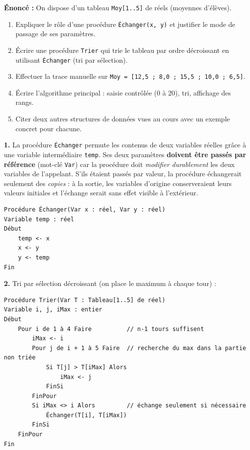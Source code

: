\documentclass[11pt]{article}
\begin{document}
\begin{corrige}
\textbf{Énoncé :} On dispose d'un tableau \texttt{Moy[1..5]} de réels (moyennes d'élèves).
\begin{enumerate}
  \item Expliquer le rôle d'une procédure \texttt{Échanger(x, y)} et justifier le mode de passage de ses paramètres.
  \item Écrire une procédure \texttt{Trier} qui trie le tableau par ordre décroissant en utilisant \texttt{Échanger} (tri par sélection).
  \item Effectuer la trace manuelle sur \texttt{Moy = [12,5 ; 8,0 ; 15,5 ; 10,0 ; 6,5]}.
  \item Écrire l'algorithme principal : saisie contrôlée (0 à 20), tri, affichage des rangs.
  \item Citer deux autres structures de données vues au cours avec un exemple concret pour chacune.
\end{enumerate}
\tcblower
\textbf{1.} La procédure \texttt{Échanger} permute les contenus de deux variables réelles grâce à une variable intermédiaire \texttt{temp}. Ses deux paramètres \textbf{doivent être passés par référence} (mot-clé \texttt{Var}) car la procédure doit \emph{modifier durablement} les deux variables de l'appelant. S'ils étaient passés par valeur, la procédure échangerait seulement des \emph{copies} : à la sortie, les variables d'origine conserveraient leurs valeurs initiales et l'échange serait sans effet visible à l'extérieur.

\begin{lstlisting}
Procédure Échanger(Var x : réel, Var y : réel)
Variable temp : réel
Début
    temp <- x
    x <- y
    y <- temp
Fin
\end{lstlisting}

\textbf{2.} Tri par sélection décroissant (on place le maximum à chaque tour) :

\begin{lstlisting}
Procédure Trier(Var T : Tableau[1..5] de réel)
Variable i, j, iMax : entier
Début
    Pour i de 1 à 4 Faire          // n-1 tours suffisent
        iMax <- i
        Pour j de i + 1 à 5 Faire  // recherche du max dans la partie non triée
            Si T[j] > T[iMax] Alors
                iMax <- j
            FinSi
        FinPour
        Si iMax <> i Alors         // échange seulement si nécessaire
            Échanger(T[i], T[iMax])
        FinSi
    FinPour
Fin
\end{lstlisting}


\end{corrige}
\end{document}
